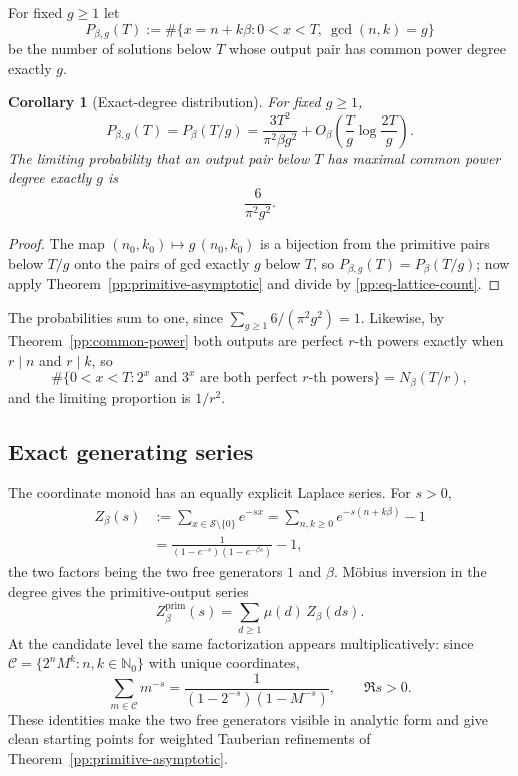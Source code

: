 \documentclass[11pt,oneside]{article}
\newtheorem{corollary}[theorem]{Corollary}
\theoremstyle{definition}
\theoremstyle{remark}
\newcommand{\Nzero}{\mathbb N_0}
\newcommand{\Sol}{\mathcal S}
\newcommand{\Cand}{\mathcal C}
\begin{document}
For fixed $g\ge1$ let
\[
 P_{\beta,g}(T):=\#\bigl\{x=n+k\beta:0<x<T,\ \gcd(n,k)=g\bigr\}
\]
be the number of solutions below $T$ whose output pair has common power degree exactly $g$.

\begin{corollary}[Exact-degree distribution]
\label{pp:degree-distribution}
For fixed $g\ge1$,
\[
 P_{\beta,g}(T)=P_{\beta}(T/g)
 =\frac{3T^2}{\pi^2\beta g^2}
  +O_{\beta}\!\left(\frac Tg\log\frac{2T}{g}\right).
\]
The limiting probability that an output pair below $T$ has maximal common power degree exactly
$g$ is
\[
 \frac6{\pi^2g^2}.
\]
\end{corollary}

\begin{proof}
The map $(n_0,k_0)\mapsto g\,(n_0,k_0)$ is a bijection from the primitive pairs below $T/g$
onto the pairs of gcd exactly $g$ below $T$, so $P_{\beta,g}(T)=P_{\beta}(T/g)$; now apply
Theorem~\ref{pp:primitive-asymptotic} and divide by \eqref{pp:eq-lattice-count}.
\end{proof}

The probabilities sum to one, since $\sum_{g\ge1}6/(\pi^2g^2)=1$.  Likewise, by
Theorem~\ref{pp:common-power} both outputs are perfect $r$-th powers exactly when $r\mid n$ and
$r\mid k$, so
\begin{equation}
 \#\bigl\{0<x<T:\text{$2^x$ and $3^x$ are both perfect $r$-th powers}\bigr\}
 =N_{\beta}(T/r),
\label{pp:eq-rth-power-frequency}
\end{equation}
and the limiting proportion is $1/r^2$.

\subsection{Exact generating series}

The coordinate monoid has an equally explicit Laplace series.  For $s>0$,
\begin{equation}
\begin{aligned}
 Z_{\beta}(s)
 &:=\sum_{x\in\Sol\setminus\{0\}}e^{-sx}
  =\sum_{n,k\ge0}e^{-s(n+k\beta)}-1\\
 &=\frac1{(1-e^{-s})(1-e^{-\beta s})}-1 ,
\end{aligned}
\label{pp:eq-laplace-series}
\end{equation}
the two factors being the two free generators $1$ and $\beta$.  M\"obius inversion in the degree
gives the primitive-output series
\[
 Z_{\beta}^{\mathrm{prim}}(s)=\sum_{d\ge1}\mu(d)\,Z_{\beta}(ds).
\]
At the candidate level the same factorization appears multiplicatively: since
$\Cand=\{2^nM^k:n,k\in\Nzero\}$ with unique coordinates,
\begin{equation}
 \sum_{m\in\Cand}m^{-s}
 =\frac1{(1-2^{-s})(1-M^{-s})},
 \qquad \Re s>0.
\label{pp:eq-candidate-dirichlet}
\end{equation}
These identities make the two free generators visible in analytic form and give clean starting
points for weighted Tauberian refinements of Theorem~\ref{pp:primitive-asymptotic}.
\end{document}
